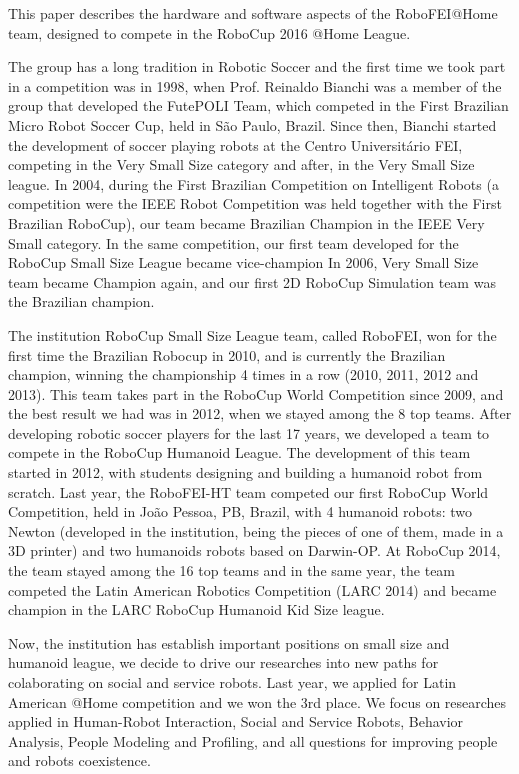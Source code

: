 This paper describes the hardware and software aspects of the RoboFEI@Home team, designed to compete in the RoboCup 2016 @Home League.

The group has a long tradition in Robotic Soccer and the first time we took part in a competition was in 1998, when Prof. Reinaldo Bianchi was a member of the group that developed the FutePOLI Team, which competed in the First Brazilian Micro Robot Soccer Cup, held in São Paulo, Brazil. Since then, Bianchi started the development of soccer playing robots at the Centro Universitário FEI, competing in the Very Small Size category and after, in the Very Small Size league. In 2004, during the First Brazilian Competition on Intelligent Robots (a competition were the IEEE Robot Competition was held together with the First Brazilian RoboCup), our team became Brazilian Champion in the IEEE Very Small category. In the same competition, our first team developed for the RoboCup Small Size League became vice-champion In 2006, Very Small Size team became Champion again, and our first 2D RoboCup Simulation team was the Brazilian champion.

The institution RoboCup Small Size League team, called RoboFEI, won for the first time the Brazilian Robocup in 2010, and is currently the Brazilian champion, winning the championship 4 times in a row (2010, 2011, 2012 and 2013). This team takes part in the RoboCup World Competition since 2009, and the best result we had was in 2012, when we stayed among the 8 top teams. After developing robotic soccer players for the last 17 years, we developed a team to compete in the RoboCup Humanoid League. The development of this team started in 2012, with students designing and building a humanoid robot from scratch. Last year, the RoboFEI-HT team competed our first RoboCup World Competition, held in João Pessoa, PB, Brazil, with 4 humanoid robots: two Newton (developed in the institution, being the pieces of one of them, made in a 3D printer) and two humanoids robots based on Darwin-OP. At RoboCup 2014, the team stayed among the 16 top teams and in the same year, the team competed the Latin American Robotics Competition (LARC 2014) and became champion in the LARC RoboCup Humanoid Kid Size league.

Now, the institution has establish important positions on small size and humanoid league, we decide to drive our researches into new paths for colaborating on social and service robots. Last year, we applied for Latin American @Home competition and we won the 3rd place. We focus on researches applied in Human-Robot Interaction, Social and Service Robots, Behavior Analysis, People Modeling and Profiling, and all questions for improving people and robots coexistence.